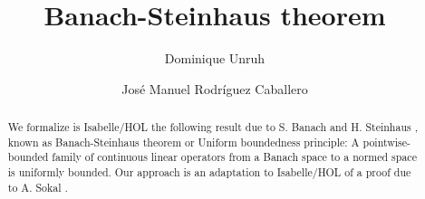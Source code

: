 \documentclass[11pt,a4paper]{article}
\begin{document}
\title{Banach-Steinhaus theorem}
\author{Dominique Unruh \and Jos\'e Manuel Rodr\'iguez Caballero}
\maketitle

\begin{abstract}
We formalize is Isabelle/HOL the following result \cite{Weisstein_UBP} due to S. Banach and H. Steinhaus \cite{banach1927principe}, known as Banach-Steinhaus theorem or Uniform boundedness principle: A pointwise-bounded family of continuous linear operators from a Banach space to a normed space is uniformly bounded. Our approach is an adaptation to Isabelle/HOL of a proof due to A. Sokal \cite{sokal2011really}.
\end{abstract}

\tableofcontents






\end{document}
